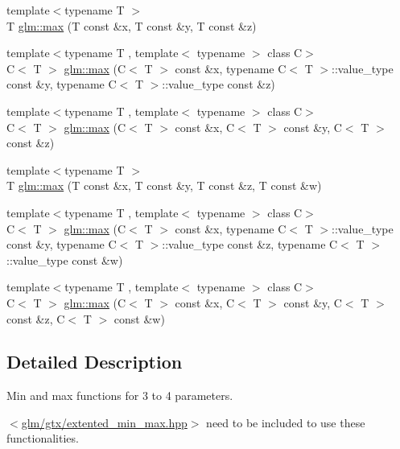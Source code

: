 \begin{DoxyCompactItemize}
\item 
{\footnotesize template$<$typename T $>$ }\\T \hyperlink{group__gtx__extented__min__max_gacf95a09cc9ae2fd9c4412f6d2ab4cdd6}{glm\+::max} (T const \&x, T const \&y, T const \&z)
\item 
{\footnotesize template$<$typename T , template$<$ typename $>$ class C$>$ }\\C$<$ T $>$ \hyperlink{group__gtx__extented__min__max_ga0ec6528b8efa37fd7570fd5e83431909}{glm\+::max} (C$<$ T $>$ const \&x, typename C$<$ T $>$\+::value\+\_\+type const \&y, typename C$<$ T $>$\+::value\+\_\+type const \&z)
\item 
{\footnotesize template$<$typename T , template$<$ typename $>$ class C$>$ }\\C$<$ T $>$ \hyperlink{group__gtx__extented__min__max_gabce5be93a81bd88050511f8053dc7506}{glm\+::max} (C$<$ T $>$ const \&x, C$<$ T $>$ const \&y, C$<$ T $>$ const \&z)
\item 
{\footnotesize template$<$typename T $>$ }\\T \hyperlink{group__gtx__extented__min__max_ga182c8b93fb0330d69d7b7de753e55b43}{glm\+::max} (T const \&x, T const \&y, T const \&z, T const \&w)
\item 
{\footnotesize template$<$typename T , template$<$ typename $>$ class C$>$ }\\C$<$ T $>$ \hyperlink{group__gtx__extented__min__max_ga6bdb95318ecd311ed6b577022b93ab57}{glm\+::max} (C$<$ T $>$ const \&x, typename C$<$ T $>$\+::value\+\_\+type const \&y, typename C$<$ T $>$\+::value\+\_\+type const \&z, typename C$<$ T $>$\+::value\+\_\+type const \&w)
\item 
{\footnotesize template$<$typename T , template$<$ typename $>$ class C$>$ }\\C$<$ T $>$ \hyperlink{group__gtx__extented__min__max_ga50cbe34b354aa247e7cf7a7f9d4d53e2}{glm\+::max} (C$<$ T $>$ const \&x, C$<$ T $>$ const \&y, C$<$ T $>$ const \&z, C$<$ T $>$ const \&w)
\end{DoxyCompactItemize}


\subsection{Detailed Description}
Min and max functions for 3 to 4 parameters.

$<$\hyperlink{extented__min__max_8hpp}{glm/gtx/extented\+\_\+min\+\_\+max.\+hpp}$>$ need to be included to use these functionalities. 

